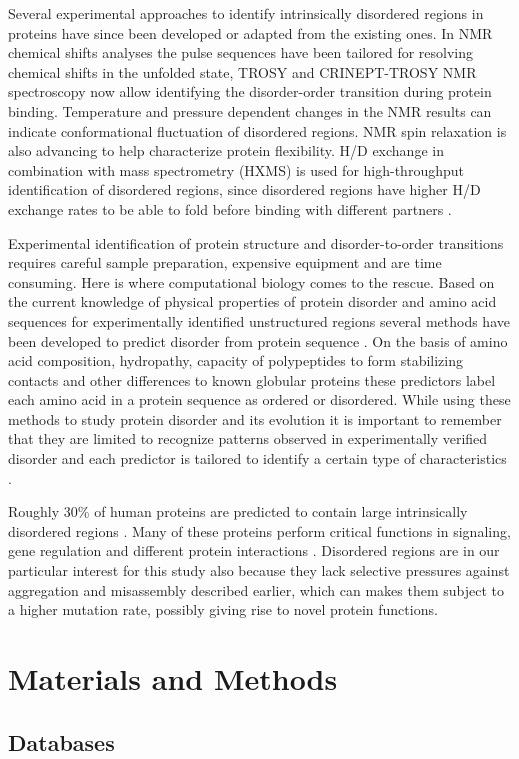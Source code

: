 \documentclass[11pt, a4paper,oneside]{report}
\newcommand{\mychapter}[2]{
    \setcounter{chapter}{#1}
    \setcounter{section}{0}
    \chapter*{#2}
    \addcontentsline{toc}{chapter}{#2}
}
\begin{document}
Several experimental approaches to identify intrinsically disordered regions in proteins have since been developed or adapted from the existing ones. In NMR chemical shifts analyses the pulse sequences have been tailored for resolving chemical shifts in the unfolded state, TROSY and CRINEPT-TROSY NMR spectroscopy now allow identifying the disorder-order transition during protein binding. Temperature and pressure dependent changes in the NMR results can indicate conformational fluctuation of disordered regions. NMR spin relaxation is also advancing to help characterize protein flexibility. H/D exchange in combination with mass spectrometry (HXMS) is used for high-throughput identification of disordered regions, since disordered regions have higher H/D exchange rates to be able to fold before binding with different partners \cite{Balasubramaniam2013}.  

Experimental identification of protein structure and disorder-to-order transitions requires careful sample preparation, expensive equipment and are time consuming.  Here is where computational biology comes to the rescue. Based on the current knowledge of physical properties of protein disorder and amino acid sequences for experimentally identified unstructured regions several methods have been developed to predict disorder from protein sequence \cite{Ferron2006}. On the basis of amino acid composition, hydropathy, capacity of polypeptides to form stabilizing contacts and other differences to known globular proteins these predictors label each amino acid in a protein sequence as ordered or disordered. While using these methods to study protein disorder and its evolution it is important to remember that they are limited to recognize patterns observed in experimentally verified disorder and each predictor is tailored to identify a certain type of characteristics \cite{Dunker2011}.

Roughly 30\% of human proteins are predicted to contain large intrinsically disordered regions \cite{Ward2004}. Many of these proteins perform critical functions in signaling, gene regulation and different protein interactions \cite{Iakoucheva2002}. Disordered regions are in our particular interest for this study also because they lack selective pressures against aggregation and misassembly described earlier, which can makes them subject to a higher mutation rate, possibly giving rise to novel protein functions.   

\mychapter{2}{Materials and Methods}
\section{Databases}
\end{document}
